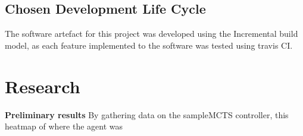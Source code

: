 \documentclass[journal]{IEEEtran}
\begin{document}


 




	\subsection{Chosen Development Life Cycle}
		The software artefact for this project was developed using the Incremental build model, as each feature implemented to the software was tested using travis CI.











	
\section{Research}
	\textbf{Preliminary results}
		By gathering data on the sampleMCTS controller, this heatmap of where the agent was 


	 







\end{document}
